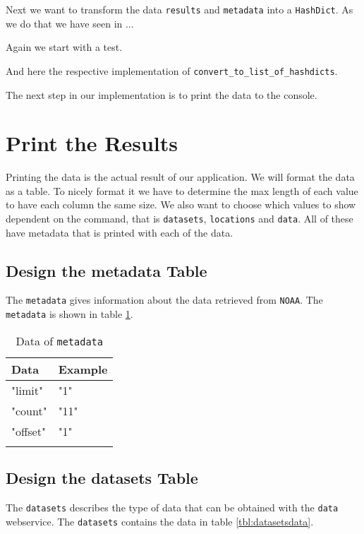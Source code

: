 \documentclass[10pt, a4paper]{article}
\newcommand{\includecode}[3]{}
\begin{document}
Next we want to transform the data \texttt{results} and \texttt{metadata} 
into a \texttt{HashDict}. As we do that we have seen in ...

Again we start with a test.

\includecode{test/transform\_test.exs}{lst:transformtest}
            {listings/transform-test.exs}

And here the respective implementation of 
\texttt{convert\_to\_list\_of\_hashdicts}.

\includecode{lib/cli7.ex}{lst:cli7}{listings/cli7.ex}

The next step in our implementation is to print the data to the console.

\section{Print the Results}
Printing the data is the actual result of our application. We will format
the data as a table. To nicely format it we have to determine the max length
of each value to have each column the same size. We also want to choose
which values to show dependent on the command, that is \texttt{datasets},
\texttt{locations} and \texttt{data}. All of these have metadata that is
printed with each of the data.

\subsection{Design the metadata Table}
The \texttt{metadata} gives information about the data retrieved from
\texttt{NOAA}. The \texttt{metadata} is shown in table 
\ref{tbl:metadatadata}.

\begin{table}[h]\footnotesize
  \caption{Data of \texttt{metadata}}
  \begin{tabular}{p{5cm} p{7cm}}
    \hline
    \textbf{Data} & \textbf{Example} \\
    \hline
    "limit"   & "1" \\
    "count"   & "11" \\
    "offset"  & "1" \\
    \hline
    \label{tbl:metadatadata}
  \end{tabular}
\end{table}

\subsection{Design the datasets Table}
The \texttt{datasets} describes the type of data that can be obtained with
the \texttt{data} webservice. The \texttt{datasets} contains the data in
table \ref{tbl:datasetsdata}.
\end{document}
